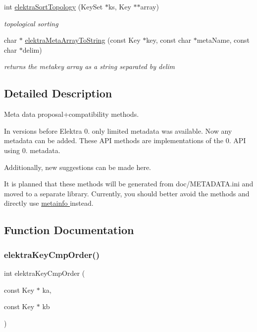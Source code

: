 \begin{DoxyCompactItemize}
int \hyperlink{group__meta_gaadfae80314be2415a7654fe8a0d2ee82}{elektra\+Sort\+Topology} (Key\+Set $\ast$ks, Key $\ast$$\ast$array)
\begin{DoxyCompactList}\small\item\em topological sorting \end{DoxyCompactList}\item 
char $\ast$ \hyperlink{group__meta_ga40469799e2c6e9937eaf013bfc05d014}{elektra\+Meta\+Array\+To\+String} (const Key $\ast$key, const char $\ast$meta\+Name, const char $\ast$delim)
\begin{DoxyCompactList}\small\item\em returns the metakey array as a string separated by delim \end{DoxyCompactList}\end{DoxyCompactItemize}


\subsection{Detailed Description}
Meta data proposal+compatibility methods. 

In versions before Elektra 0. only limited metadata was available. Now any metadata can be added. These A\+PI methods are implementations of the 0. A\+PI using 0. metadata.

Additionally, new suggestions can be made here.

It is planned that these methods will be generated from doc/\+M\+E\+T\+A\+D\+A\+T\+A.\+ini and moved to a separate library. Currently, you should better avoid the methods and directly use \hyperlink{group__keymeta}{metainfo } instead. 

\subsection{Function Documentation}
\mbox{\label{group__meta_gab8b30dfabb0867bd6899e60e7bd193a2}} 
\subsubsection{\texorpdfstring{elektra\+Key\+Cmp\+Order()}{elektraKeyCmpOrder()}}
{\footnotesize\ttfamily int elektra\+Key\+Cmp\+Order (\begin{DoxyParamCaption}\item[{const Key $\ast$}]{ka,  }\item[{const Key $\ast$}]{kb }\end{DoxyParamCaption})}



